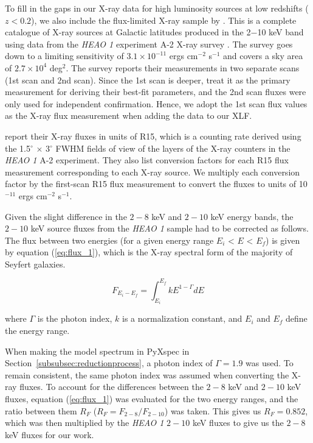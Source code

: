 \documentclass[fleqn,usenatbib]{mnras}
\begin{document}
    To fill in the gaps in our X-ray data for high luminosity sources at low redshifts ($z < 0.2$), we also include the flux-limited X-ray sample by \cite{piccinotti1982heao1xlf}.
    This is a complete catalogue of X-ray sources at Galactic latitudes produced in the 2$-$10 keV band using data from the \textit{HEAO 1} experiment A-2 X-ray survey \citep{rothschild1979heao1survey}.
    The survey goes down to a limiting sensitivity of $3.1 \times 10^{-11}$ ergs cm$^{-2}$ s$^{-1}$ and covers a sky area of $2.7 \times 10^{4}$ deg$^2$.
    The survey reports their measurements in two separate scans (1st scan and 2nd scan).
    Since the 1st scan is deeper, \cite{piccinotti1982heao1xlf} treat it as the primary measurement for deriving their best-fit parameters, and the 2nd scan fluxes were only used for independent confirmation. 
    Hence, we adopt the 1st scan flux values as the X-ray flux measurement when adding the data to our XLF.
    
    \cite{piccinotti1982heao1xlf} report their X-ray fluxes in units of R15, which is a counting rate derived using the 1.5$^\circ$ $\times$ 3$^\circ$ FWHM fields of view of the layers of the X-ray counters in the \textit{HEAO 1} A-2 experiment.
    They also list conversion factors for each R15 flux measurement corresponding to each X-ray source.
    We multiply each conversion factor by the first-scan R15 flux measurement to convert the fluxes to units of 10$^{-11}$ ergs cm$^{-2}$ s$^{-1}$.
    
    Given the slight difference in the $2-8$ keV and $2-10$ keV energy bands, the $2-10$ keV source fluxes from the \textit{HEAO 1} sample had to be corrected as follows. 
	The flux between two energies (for a given energy range $E_{i}$ < $E$ < $E_{f}$) is given by equation (\ref{eq:flux_1}), which is the X-ray spectral form of the majority of Seyfert galaxies.

		\begin{equation}\label{eq:flux_1}
		F_{E_{i} - E_f} = \int_{E_{i}}^{E_{f}} kE^{1-\Gamma} dE
		\end{equation}
		
	\noindent where $\Gamma$ is the photon index, $k$ is a normalization constant, and $E_{i}$ and $E_{f}$ define the energy range. 
	
	When making the model spectrum in PyXspec in Section~\ref{subsubsec:reductionprocess}, a photon index of $\Gamma = 1.9$ was used. 
	To remain consistent, the same photon index was assumed when converting the X-ray fluxes. 
	To account for the differences between the $2-8$ keV and $2-10$ keV fluxes, equation (\ref{eq:flux_1}) was evaluated for the two energy ranges, and the ratio between them $R_{F}$ ($R_{F} = F_{2-8} / F_{2-10}$) was taken.
	This gives us $R_{F} = 0.852$, which was then multiplied by the \textit{HEAO 1} $2-10$ keV fluxes to give us the $2-8$ keV fluxes for our work.
\end{document}
